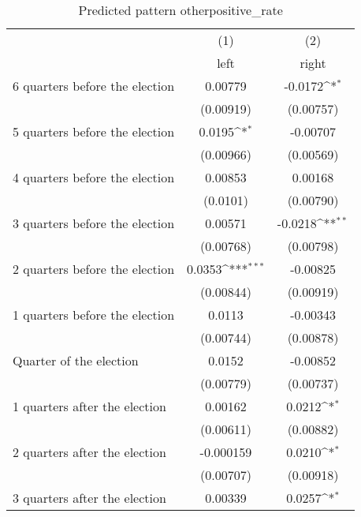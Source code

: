 \begin{table}[htbp]\centering
\def\sym#1{\ifmmode^{#1}\else\(^{#1}\)\fi}
\caption{Predicted pattern otherpositive\_rate}
\begin{tabular}{l*{2}{c}}
\hline\hline
                    &\multicolumn{1}{c}{(1)}&\multicolumn{1}{c}{(2)}\\
                    &\multicolumn{1}{c}{left}&\multicolumn{1}{c}{right}\\
\hline
 6 quarters before the election&     0.00779         &     -0.0172\sym{*}  \\
                    &   (0.00919)         &   (0.00757)         \\
[1em]
 5 quarters before the election&      0.0195\sym{*}  &    -0.00707         \\
                    &   (0.00966)         &   (0.00569)         \\
[1em]
 4 quarters before the election&     0.00853         &     0.00168         \\
                    &    (0.0101)         &   (0.00790)         \\
[1em]
 3 quarters before the election&     0.00571         &     -0.0218\sym{**} \\
                    &   (0.00768)         &   (0.00798)         \\
[1em]
 2 quarters before the election&      0.0353\sym{***}&    -0.00825         \\
                    &   (0.00844)         &   (0.00919)         \\
[1em]
 1 quarters before the election&      0.0113         &    -0.00343         \\
                    &   (0.00744)         &   (0.00878)         \\
[1em]
Quarter of the election&      0.0152         &    -0.00852         \\
                    &   (0.00779)         &   (0.00737)         \\
[1em]
 1 quarters after the election&     0.00162         &      0.0212\sym{*}  \\
                    &   (0.00611)         &   (0.00882)         \\
[1em]
 2 quarters after the election&   -0.000159         &      0.0210\sym{*}  \\
                    &   (0.00707)         &   (0.00918)         \\
[1em]
 3 quarters after the election&     0.00339         &      0.0257\sym{*}  \\

\end{tabular}
\end{table}
